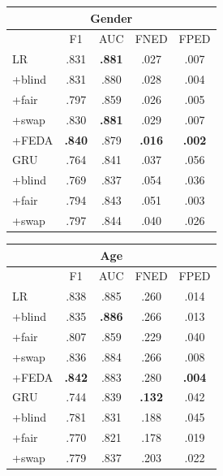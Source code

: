 \begin{table}[tb!]
\centering
\begin{tabular}{l||cc|cc}
\multicolumn{5}{c}{\bf Gender} \\\hline
&F1&AUC&FNED&FPED\\\hline\hline
LR& .831 & \bf .881 & .027 & .007 \\
+blind& .831 & .880 & .028 & .004\\
+fair& .797 & .859 & .026 & .005 \\
+swap& .830 & \bf .881 & .029 & .007 \\
+FEDA& \bf .840 & .879 & \bf .016 & \bf .002\\
\hline
GRU& .764 & .841 & .037 & .056 \\
+blind& .769 & .837 & .054 & .036\\
+fair& .794 & .843 & .051 & .003\\
+swap& .797 & .844 & .040 & .026\\\hline
\end{tabular}
\quad
\begin{tabular}{l||cc|cc}
\multicolumn{5}{c}{\bf Age} \\\hline
&F1&AUC&FNED&FPED\\\hline\hline
LR& .838 & .885 & .260 & .014\\
+blind& .835 & \bf .886 & .266 & .013 \\
+fair& .807 & .859 & .229 & .040\\
+swap& .836 & .884 & .266 & .008\\
+FEDA& \bf .842 & .883 & .280 & \bf .004\\
\hline
GRU& .744 & .839 & \bf .132 & .042\\
+blind& .781 & .831 & .188 & .045 \\
+fair& .770 & .821 & .178 & .019 \\
+swap& .779 & .837 & .203 & .022 \\\hline
\end{tabular}


\end{table}
